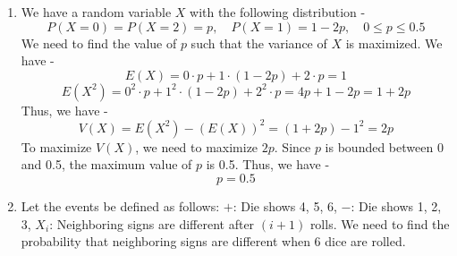 \begin{enumerate}
    \begin{center}
        \begin{tabular}{|c|c|c|c|}
            \hline
            $x$ & -3 & 6 & 9 \\
            \hline
            $P(X=x)$ & $\frac{1}{16}$ & $\frac{1}{2}$ & $\frac{1}{3}$\\
            \hline
        \end{tabular}
    \end{center}
    We need to calculate $E(X)$, $V(X)$ and $E(2X + 1)$. We have -
    \begin{enumerate}
        \item Calculating $E(X)$, we have -
        \[E(X) = \sum x \cdot P(X=x) = -3 \cdot \frac{1}{16} + 6 \cdot \frac{1}{2} + 9 \cdot \frac{1}{3}\]
        \[\boxed{= -\frac{3}{16} + 3 + 3 = \frac{93}{16} = 5.8125
        }\]
        \item Calculating $V(X)$, we have -
        \[V(X) = E(X^2) - (E(X))^2\]
        where \[E(X^2) = \sum x^2 \cdot P(X=x) = (-3)^2 \cdot \frac{1}{16} + 6^2 \cdot \frac{1}{2} + 9^2 \cdot \frac{1}{3}\]
        \[\boxed{= \frac{9}{16} + 18 + 27 = \frac{783}{16} = 48.9375
        }\]
        Thus, we have -
        \[\boxed{V(X) = \frac{783}{16} - \left(\frac{93}{16}\right)^2 = \frac{783}{16} - \frac{8649}{256} = \frac{783 \cdot 16 - 8649}{256} = \frac{12528 - 8649}{256} = \frac{3879}{256} \approx 15.1445
        }\]
        \item Calculating $E(2X + 1)$, we have -
        \[E(2X + 1) = 2E(X) + 1 = 2 \cdot \frac{93}{16} + 1\]
        \[\boxed{= \frac{186}{16} + \frac{16}{16} = \frac{202}{16} = \frac{101}{8} = 12.625
        }\]
        \end{enumerate}
    \item We have a random variable $X$ with the following distribution - 
    $$P(X=0) = P(X=2) = p, \quad P(X=1) = 1 - 2p, \quad 0 \leq p \leq 0.5$$
    We need to find the value of $p$ such that the variance of $X$ is maximized. We have -
    \[E(X) = 0 \cdot p + 1 \cdot (1 - 2p) + 2 \cdot p = 1\]
    \[E(X^2) = 0^2 \cdot p + 1^2 \cdot (1 - 2p) + 2^2 \cdot p = 4p + 1 - 2p = 1 + 2p\]
    Thus, we have -
    \[V(X) = E(X^2) - (E(X))^2 = (1 + 2p) - 1^2 = 2p\]
    To maximize $V(X)$, we need to maximize $2p$. Since $p$ is bounded between 0 and 0.5, the maximum value of $p$ is 0.5. Thus, we have -
    \[\boxed{p = 0.5
    }\]
    \item Let the events be defined as follows:
    $+$: Die shows 4, 5, 6, $-$: Die shows 1, 2, 3, $X_i$: Neighboring signs are different after $(i+1)$ rolls. We need to find the probability that neighboring signs are different when 6 dice are rolled. \\

\end{enumerate}
